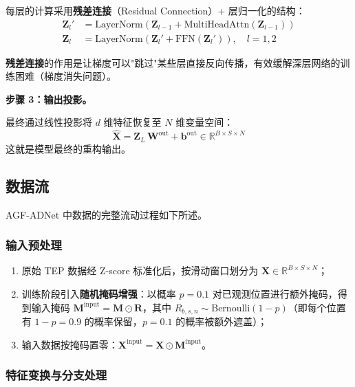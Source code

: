 \documentclass[UTF8]{ctexart}
\begin{document}
每层的计算采用\textbf{残差连接}（Residual Connection）+ 层归一化的结构：
\begin{align}
    \mathbf{Z}_l' &= \mathrm{LayerNorm}\!\left(\mathbf{Z}_{l-1} + \mathrm{MultiHeadAttn}(\mathbf{Z}_{l-1})\right) \\
    \mathbf{Z}_l &= \mathrm{LayerNorm}\!\left(\mathbf{Z}_l' + \mathrm{FFN}(\mathbf{Z}_l')\right), \quad l = 1, 2
\end{align}

\textbf{残差连接}的作用是让梯度可以"跳过"某些层直接反向传播，有效缓解深层网络的训练困难（梯度消失问题）。

\textbf{步骤 3：输出投影。}

最终通过线性投影将 $d$ 维特征恢复至 $N$ 维变量空间：
\begin{equation}
    \hat{\mathbf{X}} = \mathbf{Z}_L \, \mathbf{W}^{\text{out}} + \mathbf{b}^{\text{out}} \in \mathbb{R}^{B \times S \times N}
\end{equation}
这就是模型最终的重构输出。

\subsection{数据流}

AGF-ADNet 中数据的完整流动过程如下所述。

\subsubsection{输入预处理}

\begin{enumerate}
    \item 原始 TEP 数据经 Z-score 标准化后，按滑动窗口划分为 $\mathbf{X} \in \mathbb{R}^{B \times S \times N}$；
    \item 训练阶段引入\textbf{随机掩码增强}：以概率 $p=0.1$ 对已观测位置进行额外掩码，得到输入掩码 $\mathbf{M}^{\text{input}} = \mathbf{M} \odot \mathbf{R}$，其中 $R_{b,s,n} \sim \mathrm{Bernoulli}(1-p)$（即每个位置有 $1-p=0.9$ 的概率保留，$p=0.1$ 的概率被额外遮盖）；
    \item 输入数据按掩码置零：$\mathbf{X}^{\text{input}} = \mathbf{X} \odot \mathbf{M}^{\text{input}}$。
\end{enumerate}

\subsubsection{特征变换与分支处理}
\end{document}
